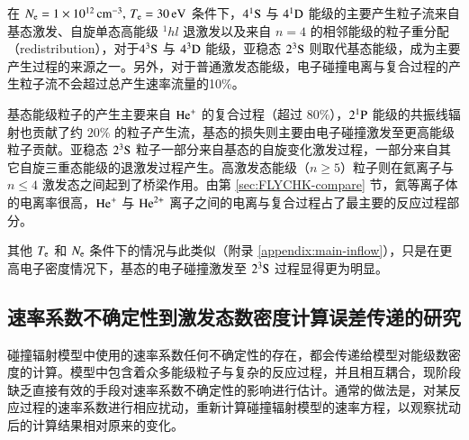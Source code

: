 在 $N_{\rm e}=1\times10^{12}\,{\rm cm}^{-3},\,T_{\rm e}=30\,{\rm eV}$ 条件下，$4^1{\rm S}$ 与 $4^1{\rm D}$ 能级的主要产生粒子流来自基态激发、自旋单态高能级 $^1hl$ 退激发以及来自 $n=4$ 的相邻能级的粒子重分配（redistribution），对于$4^3{\rm S}$ 与 $4^3{\rm D}$ 能级，亚稳态 $2^3{\rm S}$ 则取代基态能级，成为主要产生过程的来源之一。另外，对于普通激发态能级，电子碰撞电离与复合过程的产生粒子流不会超过总产生速率流量的10\%。

基态能级粒子的产生主要来自 ${\rm He}^+$ 的复合过程（超过 $80\%$），$2^1{\rm P}$ 能级的共振线辐射也贡献了约 $20\%$ 的粒子产生流，基态的损失则主要由电子碰撞激发至更高能级粒子贡献。亚稳态 $2^3{\rm S}$ 粒子一部分来自基态的自旋变化激发过程，一部分来自其它自旋三重态能级的退激发过程产生。高激发态能级（$n\ge5$）粒子则在氦离子与 $n\le4$ 激发态之间起到了桥梁作用。由第 \ref{sec:FLYCHK-compare} 节，氦等离子体的电离率很高，${\rm He}^+$ 与 ${\rm He}^{2+}$ 离子之间的电离与复合过程占了最主要的反应过程部分。

其他 $T_{\rm e}$ 和 $N_{\rm e}$ 条件下的情况与此类似（附录 \ref{appendix:main-inflow}），只是在更高电子密度情况下，基态的电子碰撞激发至 $2^3{\rm S}$ 过程显得更为明显。

\subsection{速率系数不确定性到激发态数密度计算误差传递的研究}
\label{sec:chap04:uncertainty-transport}

碰撞辐射模型中使用的速率系数任何不确定性的存在，都会传递给模型对能级数密度的计算。模型中包含着众多能级粒子与复杂的反应过程，并且相互耦合，现阶段缺乏直接有效的手段对速率系数不确定性的影响进行估计。通常的做法是，对某反应过程的速率系数进行相应扰动，重新计算碰撞辐射模型的速率方程，以观察扰动后的计算结果相对原来的变化\cite{Andrew2000PPCFSensitivity}。

